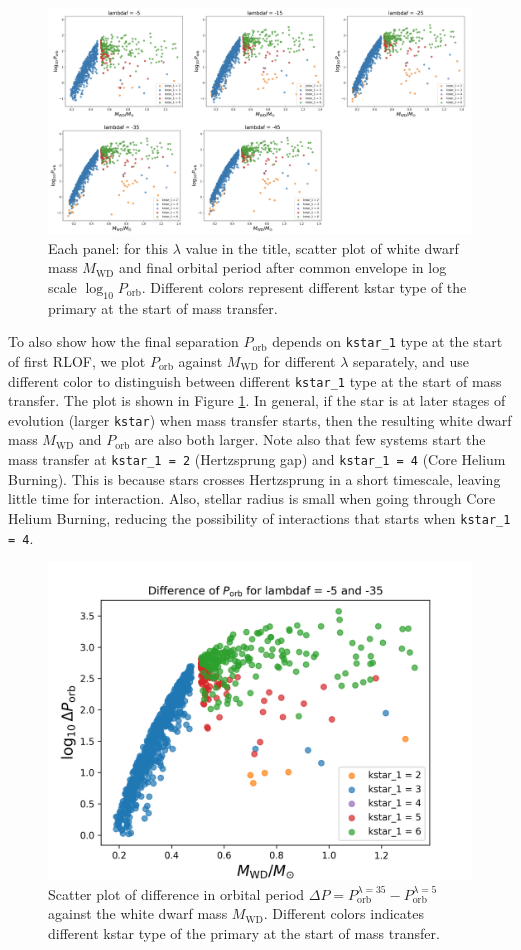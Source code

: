 \documentclass[12pt]{article}
\newcommand{\MWD}{M_{\mathrm{WD}}}
\newcommand{\Porb}{P_{\mathrm{orb}}}
\begin{document}
\begin{figure}
  \centering
  \includegraphics[width=\linewidth]{fig/kstar-map-rearr.png}
  \caption{Each panel: for this $\lambda$ value in the title, scatter plot of white dwarf mass $\MWD$ and final orbital period after common envelope in log scale $\log_{10}\Porb$. Different colors represent different kstar type of the primary at the start of mass transfer.}
  \label{kstar-map}
\end{figure}

To also show how the final separation $\Porb$ depends on \verb|kstar_1| type at the start of first RLOF, we plot $\Porb$ against $\MWD$ for different $\lambda$ separately, and use different color to distinguish between different \verb|kstar_1| type at the start of mass transfer. The plot is shown in Figure \ref{kstar-map}. In general, if the star is at later stages of evolution (larger \verb|kstar|) when mass transfer starts, then the resulting white dwarf mass $\MWD$ and $\Porb$ are also both larger. Note also that few systems start the mass transfer at \verb|kstar_1 = 2| (Hertzsprung gap) and \verb|kstar_1 = 4| (Core Helium Burning). This is because stars crosses Hertzsprung in a short timescale, leaving little time for interaction. Also, stellar radius is small when going through Core Helium Burning, reducing the possibility of interactions that starts when \verb|kstar_1 = 4|.

\begin{figure}
  \centering
  \includegraphics[width=0.6\linewidth]{fig/dif-kstar map.png}
  \caption{Scatter plot of difference in orbital period $\Delta P = P_{\mathrm{orb}}^{\lambda = 35} - P_{\mathrm{orb}}^{\lambda = 5}$ against the white dwarf mass $\MWD$. Different colors indicates different kstar type of the primary at the start of mass transfer.}
  \label{dif-kstar map}
\end{figure}
\end{document}
